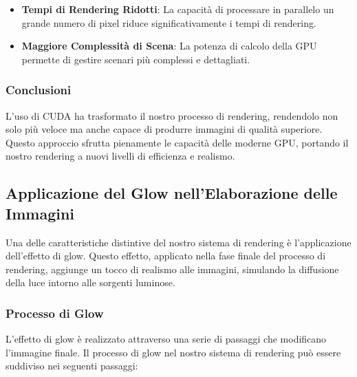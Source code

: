 \documentclass[12pt]{article}
\begin{document}
\begin{itemize}
\item \textbf{Tempi di Rendering Ridotti}: La capacità di processare in parallelo un grande numero di pixel riduce significativamente i tempi di rendering.

\item \textbf{Maggiore Complessità di Scena}: La potenza di calcolo della GPU permette di gestire scenari più complessi e dettagliati.
\end{itemize}

\subsubsection{Conclusioni}
L'uso di CUDA ha trasformato il nostro processo di rendering, rendendolo non solo più veloce ma anche capace di produrre immagini di qualità superiore. Questo approccio sfrutta pienamente le capacità delle moderne GPU, portando il nostro rendering a nuovi livelli di efficienza e realismo.

\subsection{Applicazione del Glow nell'Elaborazione delle Immagini}
Una delle caratteristiche distintive del nostro sistema di rendering è l'applicazione dell'effetto di glow. Questo effetto, applicato nella fase finale del processo di rendering, aggiunge un tocco di realismo alle immagini, simulando la diffusione della luce intorno alle sorgenti luminose.

\subsubsection{Processo di Glow}
L'effetto di glow è realizzato attraverso una serie di passaggi che modificano l'immagine finale. Il processo di glow nel nostro sistema di rendering può essere suddiviso nei seguenti passaggi:
\end{document}
